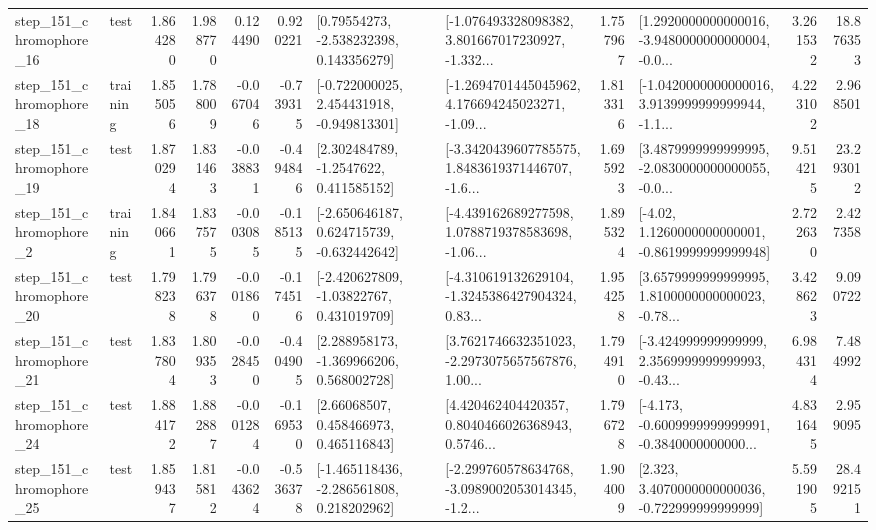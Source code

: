 \begin{tabular}{llrrrrllrlrr}
  step\_151\_chromophore\_16 &      test &      1.864280 &    1.988770 &      0.124490 &  0.920221 &     [0.79554273, -2.538232398, 0.143356279] &  [-1.076493328098382, 3.801667017230927, -1.332... &       1.757967 &  [1.2920000000000016, -3.9480000000000004, -0.0... &            3.261532 &         18.876353 \\
  step\_151\_chromophore\_18 &  training &      1.855056 &    1.788009 &     -0.067046 & -0.739315 &   [-0.722000025, 2.454431918, -0.949813301] &  [-1.2694701445045962, 4.176694245023271, -1.09... &       1.813316 &  [-1.0420000000000016, 3.9139999999999944, -1.1... &            4.223102 &          2.968501 \\
  step\_151\_chromophore\_19 &      test &      1.870294 &    1.831463 &     -0.038831 & -0.494846 &      [2.302484789, -1.2547622, 0.411585152] &  [-3.3420439607785575, 1.8483619371446707, -1.6... &       1.695923 &  [3.4879999999999995, -2.0830000000000055, -0.0... &            9.514215 &         23.293012 \\
   step\_151\_chromophore\_2 &  training &      1.840661 &    1.837575 &     -0.003085 & -0.185135 &   [-2.650646187, 0.624715739, -0.632442642] &  [-4.439162689277598, 1.0788719378583698, -1.06... &       1.895324 &   [-4.02, 1.1260000000000001, -0.8619999999999948] &            2.722630 &          2.427358 \\
  step\_151\_chromophore\_20 &      test &      1.798238 &    1.796378 &     -0.001860 & -0.174516 &    [-2.420627809, -1.03822767, 0.431019709] &  [-4.310619132629104, -1.3245386427904324, 0.83... &       1.954258 &  [3.6579999999999995, 1.8100000000000023, -0.78... &            3.428623 &          9.090722 \\
  step\_151\_chromophore\_21 &      test &      1.837804 &    1.809353 &     -0.028450 & -0.404905 &    [2.288958173, -1.369966206, 0.568002728] &  [3.7621746632351023, -2.2973075657567876, 1.00... &       1.794910 &  [-3.424999999999999, 2.3569999999999993, -0.43... &            6.984314 &          7.484992 \\
  step\_151\_chromophore\_24 &      test &      1.884172 &    1.882887 &     -0.001284 & -0.169530 &      [2.66068507, 0.458466973, 0.465116843] &  [4.420462404420357, 0.8040466026368943, 0.5746... &       1.796728 &  [-4.173, -0.6009999999999991, -0.3840000000000... &            4.831645 &          2.959095 \\
  step\_151\_chromophore\_25 &      test &      1.859437 &    1.815812 &     -0.043624 & -0.536378 &   [-1.465118436, -2.286561808, 0.218202962] &  [-2.299760578634768, -3.0989002053014345, -1.2... &       1.904009 &    [2.323, 3.4070000000000036, -0.722999999999999] &            5.591905 &         28.492151 \\

\end{tabular}
